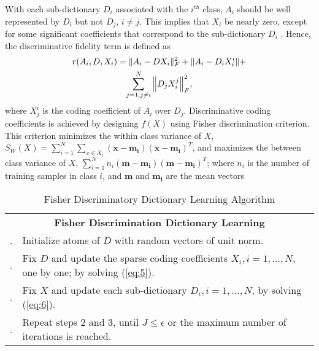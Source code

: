 \documentclass[conference]{IEEEtran}
\begin{document}
	With each sub-dictionary $D_i$ associated with the $i^{th}$ class, $A_i$ should be well represented by $D_i$ but not $D_j$, $i \neq j$. This implies that $X_i$ be nearly zero, except for some significant coefficients that correspond to the sub-dictionary $D_i$ . Hence, the discriminative fidelity term is defined as
	\begin{multline}
		\label{eq:3}
		r(A_i,D,X_i)=\Vert{A_i-DX_i}\Vert_F^2+\Vert{A_i-D_iX_i^i}\Vert+ \\
		\sum_{j=1,j\neq i}^{N}\Big\Vert{D_jX_i^j}\Big\Vert_F^2,
	\end{multline}
	where $X_j^i$ is the coding coefficient of $A_i$ over $D_j$. Discriminative coding coefficients is achieved by designing $f(X)$ using Fisher discrimination criterion. This criterion minimizes the within class variance of $X$, $S_W(X)=\sum_{i=1}^{N}\sum_{x\in X_i}(\mathrm{\textbf{x}}-\mathrm{\textbf{m}}_
	\mathrm{\textbf{i}})(\mathrm{\textbf{x}}-\mathrm{\textbf{m}}_\mathrm{\textbf{i}})^T$, and maximizes the between class variance of $X$, $\sum_{i=1}^{N}n_i(\mathrm{\textbf{m}}-\mathrm{\textbf{m}}_\mathrm{\textbf{i}})(\mathrm{\textbf{m}}-\mathrm{\textbf{m}}_\mathrm{\textbf{i}})^T$; where $n_i$ is the number of training samples in class $i$, and $\mathrm{\textbf{m}}$ and $\mathrm{\textbf{m}}_\mathrm{\textbf{i}}$ are the mean vectors
	
	
	\begin{table}
		\caption{Fisher Discriminatory Dictionary Learning Algorithm}
		\label{tab:fisher_disc}
		\begin{tabularx}{\columnwidth}{p{0.01cm} p{}}
			\cmidrule{1-2}
			\multicolumn{2}{c}{\textbf{Fisher Discrimination Dictionary Learning}} \\
			\cmidrule{1-2}
			\stepcounter{szaml}\theszaml\stepcounter{szaml}. & Initialize atoms of $D$ with random vectors of unit norm. \\
			\theszaml\stepcounter{szaml}. & Fix $D$ and update the sparse coding coefficients $X_i, i = 1, \dots, N$, one by one; by solving (\ref{eq:5}). \\
			\theszaml\stepcounter{szaml}. & Fix $X$ and update each sub-dictionary $D_i, i = 1, \dots , N$, by solving (\ref{eq:6}). \\
			\theszaml\stepcounter{szaml}. & Repeat steps 2 and 3, until $J \leq \epsilon$ or the maximum number of iterations is reached. \\
			\hline
		\end{tabularx}
	\end{table}
	
\end{document}
